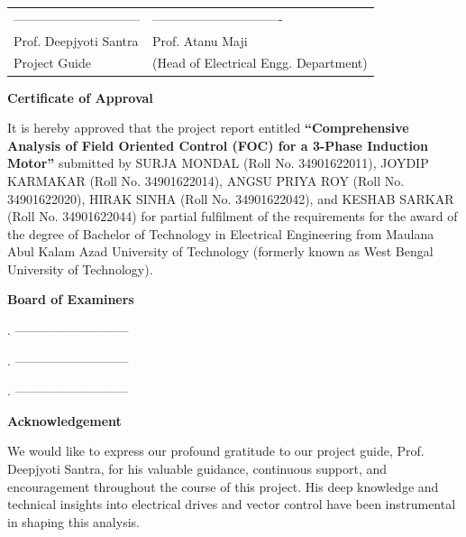 \documentclass[12pt,a4paper]{report}
\begin{document}
\noindent
\begin{tabular}{@{}p{8cm}p{8cm}@{}}
------------------------------ & ------------------------------- \\
Prof. Deepjyoti Santra & Prof. Atanu Maji \\
Project Guide & (Head of Electrical Engg. Department)
\end{tabular}

\newpage
\begin{center}
{\Large \bfseries Certificate of Approval\par}
\end{center}
\vspace{1cm}
It is hereby approved that the project report entitled \textbf{``Comprehensive Analysis of Field Oriented Control (FOC) for a 3-Phase Induction Motor''} submitted by SURJA MONDAL (Roll No. 34901622011), JOYDIP KARMAKAR (Roll No. 34901622014), ANGSU PRIYA ROY (Roll No. 34901622020), HIRAK SINHA (Roll No. 34901622042), and KESHAB SARKAR (Roll No. 34901622044) for partial fulfilment of the requirements for the award of the degree of Bachelor of Technology in Electrical Engineering from Maulana Abul Kalam Azad University of Technology (formerly known as West Bengal University of Technology).
\vspace{3cm}

\noindent \textbf{Board of Examiners}
\vspace{1.5cm}

. --------------------------- \\
\vspace{1cm}

. --------------------------- \\
\vspace{1cm}

. ---------------------------

\newpage
\begin{center}
{\Large \bfseries Acknowledgement\par}
\end{center}
\vspace{1cm}
We would like to express our profound gratitude to our project guide, Prof. Deepjyoti Santra, for his valuable guidance, continuous support, and encouragement throughout the course of this project. His deep knowledge and technical insights into electrical drives and vector control have been instrumental in shaping this analysis.
\end{document}
